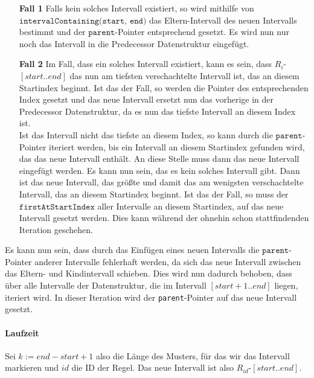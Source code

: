 \begin{itemize}[leftmargin=1.5cm]
    \item[\textbf{Fall 1}] Falls kein solches Intervall existiert, so wird mithilfe von\\
    $\texttt{intervalContaining(start, end)}$ das Eltern-Intervall des neuen Intervalls bestimmt und der $\texttt{parent}$-Pointer entsprechend gesetzt.  Es wird nun nur noch das Intervall in die Predecessor Datenstruktur eingefügt.
    \item[\textbf{Fall 2}] Im Fall, dass ein solches Intervall existiert, kann es sein, dass $R_i$-$[start..end]$ das nun am tiefsten verschachtelte Intervall ist, das an diesem Startindex beginnt. Ist das der Fall, so werden die Pointer des entsprechenden Index gesetzt und das neue Intervall ersetzt nun das vorherige in der Predecessor Datenstruktur, da es nun das tiefste Intervall an diesem Index ist.\\
    Ist das Intervall nicht das tiefste an diesem Index, so kann durch die $\texttt{parent}$-Pointer iteriert werden, bis ein Intervall an diesem Startindex gefunden wird, das das neue Intervall enthält. An diese Stelle muss dann das neue Intervall eingefügt werden. Es kann nun sein, das es kein solches Intervall gibt. Dann ist das neue Intervall, das größte und damit das am wenigsten verschachtelte Intervall, das an diesem Startindex beginnt. Ist das der Fall, so muss der $\texttt{firstAtStartIndex}$ aller Intervalle an diesem Startindex, auf das neue Intervall gesetzt werden. Dies kann während der ohnehin schon stattfindenden Iteration geschehen. 
\end{itemize} 

Es kann nun sein, dass durch das Einfügen eines neuen Intervalls die $\texttt{parent}$-Pointer anderer Intervalle fehlerhaft werden, da sich das neue Intervall zwischen das Eltern- und
Kindintervall schieben. Dies wird nun dadurch behoben, dass über alle Intervalle der Datenstruktur, die im Intervall $[start+1..end]$ liegen, iteriert wird. In dieser Iteration wird der \texttt{parent}-Pointer auf das neue Intervall gesetzt. 
\label{v4marking}

\paragraph{Laufzeit}

Sei $k := end - start + 1$ also die Länge des Musters, für das wir das Intervall markieren und $id$ die ID der Regel. Das neue Intervall ist also $R_{id}$-$[start..end]$.

